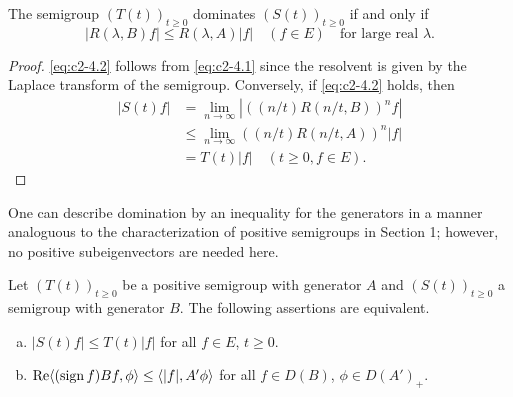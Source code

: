 \begin{proposition}\label{prop:c2-4.1}
The semigroup $(T(t))_{t \geq 0}$ dominates $(S(t))_{t \geq 0}$ if and only if
\begin{equation}\label{eq:c2-4.2}
|R(\lambda,B)f| \leq R(\lambda,A)|f| \quad (f \in E) \quad \text{for large real }  \lambda.
\end{equation}
\end{proposition}

\begin{proof}
\eqref{eq:c2-4.2} follows from \eqref{eq:c2-4.1} since the resolvent is given by the Laplace transform of the semigroup. 
Conversely, if \eqref{eq:c2-4.2} holds, then
\begin{align*}
|S(t)f| &= \lim_{n \to \infty} |((n/t)R(n/t,B))^{n}f|\\
&\leq \lim_{n \to \infty} ((n/t)R(n/t,A))^{n}|f|\\
&= T(t)|f| \quad (t \geq 0, f \in E).
\end{align*}
\end{proof}
One can describe domination by an inequality for the generators in a manner analoguous to the characterization of positive semigroups in Section 1; however, no positive subeigenvectors are needed here.

\begin{theorem}\label{thm:c2-4.2}
Let $(T(t))_{t \geq 0}$ be a positive semigroup with generator $A$ and $(S(t))_{t \geq 0}$ a semigroup with generator $B$. The following assertions are equivalent.
\begin{enumerate}[(a)]
\item \label{thm:c2-4.2-1}
$|S(t)f| \leq T(t)|f|$ for all $f \in E$, $t \geq 0$.
\item \label{thm:c2-4.2-2}
$\mathop{}\!\mathrm{Re}\langle(\operatorname{sign}  f)Bf,\phi\rangle \leq \langle|f|,A'\phi\rangle$ for all $f \in D(B)$, $\phi \in D(A')_{+}$.
\end{enumerate}
\end{theorem}

